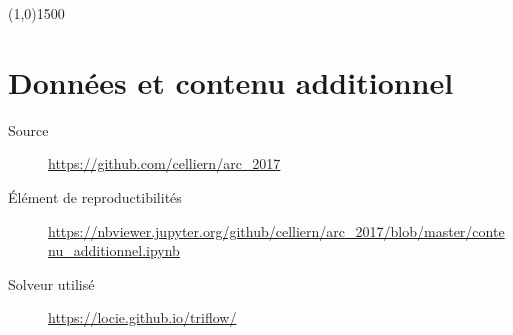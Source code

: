 \documentclass[a0,portrait]{a0poster}
\begin{document}
\begin{center}
    \line(1,0){1500}
\end{center}



\section*{Données et contenu additionnel}
\begin{description}
    \item[Source] \url{https://github.com/celliern/arc_2017}
    \item[Élément de reproductibilités] \url{https://nbviewer.jupyter.org/github/celliern/arc_2017/blob/master/contenu_additionnel.ipynb}
    \item[Solveur utilisé] \url{https://locie.github.io/triflow/}
\end{description}
\end{document}
